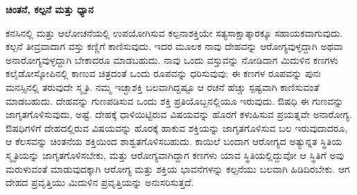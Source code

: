 \vskip -0.8cm

\begin{center}
\textbf{ಚಿಂತನೆ, ಕಲ್ಪನೆ ಮತ್ತು ಧ್ಯಾನ}
\end{center}

\vskip -0.4cm

ಕನಸಿನಲ್ಲಿ ಮತ್ತು ಆಲೋಚನೆಯಲ್ಲಿ ಉಪಯೋಗಿಸುವ ಕಲ್ಪನಾಶಕ್ತಿಯೇ ಸತ್ಯ\break ಸಾಕ್ಷಾತ್ಕಾರಕ್ಕೂ ಸಹಾಯಕವಾಗುವುದು. ಕಲ್ಪನೆ ತೀವ್ರವಾದಾಗ ವಸ್ತು ಕಣ್ಣಿಗೆ ಕಾಣಿಸುವುದು. ಇದರ ಮೂಲಕ ನಾವು ದೇಹವನ್ನು ಆರೋಗ್ಯವುಳ್ಳದ್ದಾಗಿ ಅಥವಾ ಅನಾರೋಗ್ಯವುಳ್ಳದ್ದಾಗಿ ಬೇಕಾದರೂ ಮಾಡಬಹುದು. ನಾವು ಒಂದು ವಸ್ತುವನ್ನು ನೋಡಿದಾಗ ಮಿದುಳಿನ ಕಣಗಳು ಕಲೈಡೋಸ್ಕೋಪಿನಲ್ಲಿ ಕಾಣುವ ಚಿತ್ರದಂತೆ ಒಂದು ರೂಪವನ್ನು ಧರಿಸುವುವು; ಈ ಕಣಗಳ ರೂಪವನ್ನು ಪುನಃ ಮನಸ್ಸಿನಲ್ಲಿ ತರುವುದೇ ಸ್ಮೃತಿ. ನಮ್ಮ ಇಚ್ಛಾಶಕ್ತಿ ಬಲವಾಗಿದ್ದಷ್ಟೂ ಆ ರಚನೆ ಹೆಚ್ಚು ಸ್ಪಷ್ಟವಾಗಿ ಕಾಣಿಸುವಂತೆ ಮಾಡಬಹುದು. ದೇಹವನ್ನು ಗುಣಪಡಿಸುವ ಒಂದು ಶಕ್ತಿ ಪ್ರತಿಯೊಬ್ಬನಲ್ಲಿಯೂ ಇರುವುದು. ಔಷಧಿ ಈ ಗುಣವನ್ನು ಜಾಗೃತಗೊಳಿಸುವುದು, ಅಷ್ಟೆ. ದೇಹಕ್ಕೆ ಧಾಳಿಯಿಟ್ಟಿರುವ ವಿಷಯವನ್ನು ಹೊರಗೆ ಕಳುಹಿಸುವ ಪ್ರಯತ್ನವೇ ಅನಾರೋಗ್ಯ. ಔಷಧಿಗಳಿಗೆ ದೇಹದಲ್ಲಿರುವ ವಿಷಯವನ್ನು ಹೊರಕ್ಕೆ ಹಾಕುವ ಶಕ್ತಿಯನ್ನು ಜಾಗೃತಗೊಳಿಸುವ ಬಲ ಇರುವುದಾದರೂ, ಆ ಕೆಲಸವನ್ನು ಚಿಂತನೆಯ ಶಕ್ತಿಯಿಂದ ಶಾಶ್ವತಗೊಳಿಸಬಹುದು. ಕಾಯಿಲೆ ಬಂದಾಗ ಆರೋಗ್ಯದ ಅತ್ಯುನ್ನತ ಸ್ಥಿತಿಯ ಸ್ಮೃತಿಯನ್ನು ಜಾಗೃತಗೊಳಿಸಬೇಕು, ಮತ್ತು ಆರೋಗ್ಯವಾಗಿದ್ದಾಗ ಕಣಗಳು ಯಾವ ಸ್ಥಿತಿಯಲ್ಲಿದ್ದುವೋ ಆ ಸ್ಥಿತಿಗೆ ಅವು ಮರುಳುವಂತೆ ಮಾಡುವುದಕ್ಕಾಗಿ ಆರೋಗ್ಯ ಮತ್ತು ಶಕ್ತಿಯ ಭಾವನೆಗಳನ್ನು ಕಲ್ಪನೆಯು ಬಲವಾಗಿ ಹಿಡಿದಿರಬೇಕು. ಆಗ ದೇಹದ ಪ್ರವೃತ್ತಿಯು ಮಿದುಳಿನ ಪ್ರವೃತ್ತಿಯನ್ನು ಅನುಸರಿಸುತ್ತದೆ.

